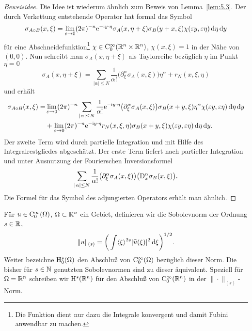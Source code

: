 \begin{proof}[Beweisidee] Die Idee ist wiederum ähnlich zum Beweis von Lemma~\ref{lem:5.3}. Der durch Verkettung entstehende Operator hat formal das Symbol
\begin{equation}
    \sigma_{A\circ B}(x,\xi) = \lim_{\varepsilon\to0}  (2\pi)^{-n} \relax \mathrm e^{-\mathrm i y\cdot\eta  } \sigma_A(x,\eta+\xi) \sigma_B(y+x,\xi) \chi(\varepsilon y,\varepsilon\eta) \,\mathrm d\eta\,\mathrm d y
\end{equation}
für eine Abschneidefunktion\footnote{Die Funktion dient nur dazu die Integrale konvergent und damit Fubini anwendbar zu machen.} $\chi\in\mathrm C_0^\infty(\mathbb R^{n}\times\mathbb R^n)$, $\chi(x,\xi)=1$ in der Nähe von $(0,0)$. Nun schreibt man $\sigma_A(x,\eta+\xi)$ als Taylorreihe bezüglich $\eta$ im Punkt $\eta=0$ 
\begin{equation}
   \sigma_A(x,\eta+\xi) = \sum_{|\alpha|\le N} \frac1{\alpha!} \big(\partial_\xi^\alpha \sigma_A(x,\xi)\big) \eta^\alpha + r_N(x,\xi,\eta)
\end{equation}
und erhält
\begin{equation}
\begin{split}
  \sigma_{A\circ B}(x,\xi) =& \lim_{\varepsilon\to0}  (2\pi)^{-n}  \sum_{|\alpha|\le N}  \frac1{\alpha!} \relax \mathrm e^{-\mathrm i y\cdot\eta  }  \big(\partial_\xi^\alpha \sigma_A(x,\xi)\big) \sigma_B(x+y,\xi)  \eta^\alpha \chi(\varepsilon y, \varepsilon \eta)\,\mathrm d\eta\,\mathrm d y \\
  &+ \lim_{\varepsilon\to0}  (2\pi)^{-n}  \relax \mathrm e^{-\mathrm i y\cdot\eta  }  r_N(x,\xi,\eta) \sigma_B(x+y,\xi)  \chi(\varepsilon y, \varepsilon \eta)\,\mathrm d\eta\,\mathrm d y.
\end{split}
\end{equation}
Der zweite Term wird durch partielle Integration und mit Hilfe des Integralrestgliedes abgeschätzt. Der erste Term liefert nach partieller Integration und unter Ausnutzung der Fourierschen Inversionsformel
\begin{equation}
  \sum_{|\alpha|\le N}  \frac1{\alpha!}  \big(\partial_\xi^\alpha \sigma_A(x,\xi)\big) \big(\mathrm D_x^\alpha \sigma_B(x,\xi)  \big).
\end{equation}
Die Formel für das Symbol des adjungierten Operators erhält man ähnlich.
\end{proof}


\begin{df}[Sobolevnormen]
Für $u\in\mathrm C_0^\infty(\Omega)$, $\Omega \subset\mathbb R^n$ ein Gebiet, definieren wir die Sobolevnorm der Ordnung $s\in\mathbb R$,
\begin{equation}
     \| u \|_{(s)} = \bigg(\int \langle\xi\rangle^{2s} |\widehat u(\xi)|^2\,\mathrm d\xi\bigg)^{1/2}. 
\end{equation}
Weiter bezeichne $\mathrm H^s_0(\Omega)$ den Abschluß von $\mathrm C_0^\infty(\Omega)$ bezüglich dieser Norm. Die bisher für $s\in\mathbb N$ genutzten Sobolevnormen sind zu dieser äquivalent. Speziell für $\Omega=\mathbb R^n$ schreiben wir $\mathrm H^s(\mathbb R^n)$ für den Abschluß von $\mathrm C_0^\infty(\mathbb R^n)$ in der $\|\cdot\|_{(s)}$-Norm.
\end{df}

